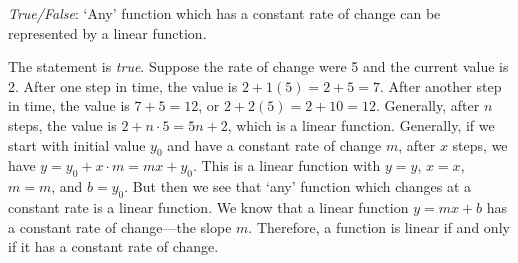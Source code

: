 \documentclass[11pt,letterpaper]{article}
\begin{document}
\quizsol \textit{True/False}: `Any' function which has a constant rate of change can be represented by a linear function. \pspace

\sol The statement is \textit{true}. Suppose the rate of change were 5 and the current value is 2. After one step in time, the value is $2 + 1(5)= 2 + 5= 7$. After another step in time, the value is $7 + 5= 12$, or $2 + 2(5)= 2 + 10= 12$. Generally, after $n$ steps, the value is $2 + n \cdot 5= 5n + 2$, which is a linear function. Generally, if we start with initial value $y_0$ and have a constant rate of change $m$, after $x$ steps, we have $y= y_0 + x \cdot m= mx + y_0$. This is a linear function with $y= y$, $x= x$, $m= m$, and $b= y_0$. But then we see that `any' function which changes at a constant rate is a linear function. We know that a linear function $y= mx + b$ has a constant rate of change---the slope $m$. Therefore, a function is linear if and only if it has a constant rate of change. 




\end{document}
